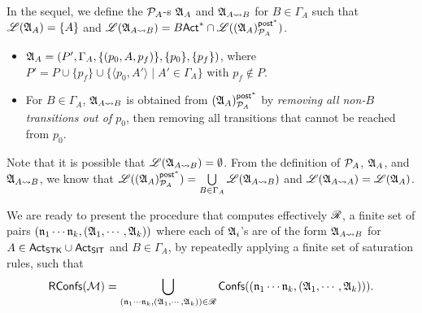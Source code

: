 In the sequel, we define the ${\mathcal{P} }_{A}$-{\NFA}s ${\mathfrak{A} }_{A}$ and ${\mathfrak{A} }_{A\rightsquigarrow B}$ for $B \in \Gamma_A$ such that ${\mathscr{L} }({\mathfrak{A} }_A) = \{A\}$ and ${\mathscr{L} }({\mathfrak{A} }_{A\rightsquigarrow B}) =B{\sf Act}^* \cap {\mathscr{L} }(({\mathfrak{A} }_{A})^{{\mathsf{post} }^*}_{{\mathcal{P} }_A})$. 
\begin{itemize}
    \item ${\mathfrak{A} }_{A} = (P', \Gamma_A, \{(p_0, A, p_f)\},\{p_0\},\{p_f\} )$, where $P' = P \cup \{p_f\} \cup \{\langle p_0,A'\rangle \mid A'\in\Gamma_A\}$ with $p_f \not \in P$.  
    \item For $B \in \Gamma_A$, ${\mathfrak{A} }_{A\rightsquigarrow B}$ is obtained from $({\mathfrak{A} }_{A})^{{\mathsf{post} }^*}_{{\mathcal{P} }_A}$ by \emph{removing all non-$B$ transitions out of $p_0$}, then removing all transitions that cannot be reached from $p_0$. 
\end{itemize}
Note that it is possible that ${\mathscr{L} }({\mathfrak{A} }_{A\rightsquigarrow B}) = \emptyset$.
From the definition of ${\mathcal{P} }_A$, ${\mathfrak{A} }_A$, and ${\mathfrak{A} }_{A\rightsquigarrow B}$, we know that ${\mathscr{L} }(({\mathfrak{A} }_A)^{{\mathsf{post} }^*}_{{\mathcal{P} }_A}) = \bigcup\limits_{B\in\Gamma_A} {\mathscr{L} }({\mathfrak{A} }_{A\rightsquigarrow B})$ and ${\mathscr{L} }({\mathfrak{A} }_{A\rightsquigarrow A}) = {\mathscr{L} }({\mathfrak{A} }_A)$. 


%

We are ready to present the procedure that computes effectively $\mathscr{R}$, a finite set of pairs $(\mathfrak{n}_1 \cdots \mathfrak{n}_k, ({\mathfrak{A} }_1, \cdots, {\mathfrak{A} }_k))$ where each of ${\mathfrak{A} }_i$'s are of the form ${\mathfrak{A} }_{A\rightsquigarrow B}$ for $A \in {\sf Act}_{\sf STK}\cup{\sf Act}_{\sf SIT}$ and $B \in \Gamma_A$, by repeatedly applying a finite set of saturation rules, such that
\[\mathsf{RConfs}({\mathcal{M} }) = \bigcup \limits_{(\mathfrak{n}_1 \cdots \mathfrak{n}_k, ({\mathfrak{A} }_1, \cdots, {\mathfrak{A} }_k)) \in \mathscr{R}} {\mathsf{Confs} }((\mathfrak{n}_1 \cdots \mathfrak{n}_k, ({\mathfrak{A} }_1, \cdots, {\mathfrak{A} }_k))).\]

